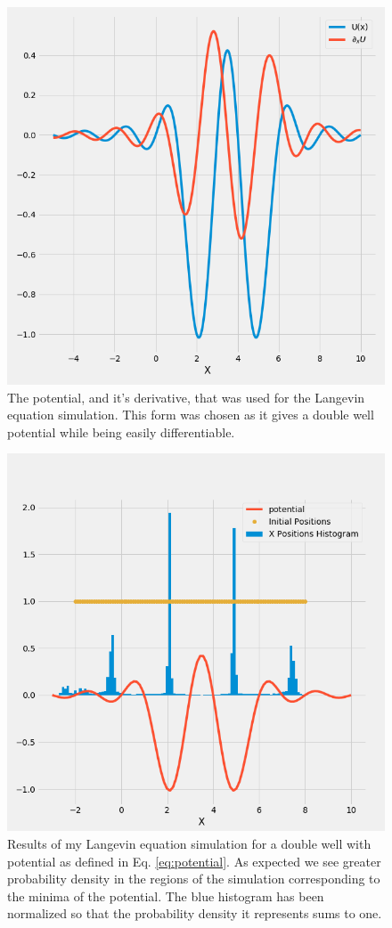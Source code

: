 \documentclass[]{article}
\begin{document}
\begin{figure}
	\centering
	\includegraphics[width=.8\linewidth]{figures/lange_potential.png}
	
	\caption{The potential, and it's derivative, that was used for the Langevin equation simulation. This form was chosen as it gives a double well potential while being easily differentiable. }
	\label{fig:potential}
\end{figure}
\begin{figure}
	\centering
	\includegraphics[width=.8\linewidth]{figures/lange_double_well.png}
	
	\caption{Results of my Langevin equation simulation for a double well with potential as defined in Eq. \ref{eq:potential}. As expected we see greater probability density in the regions of the simulation corresponding to the minima of the potential. The blue histogram has been normalized so that the probability density it represents sums to one. }
	\label{fig:lange_linear}
\end{figure}
\end{document}
